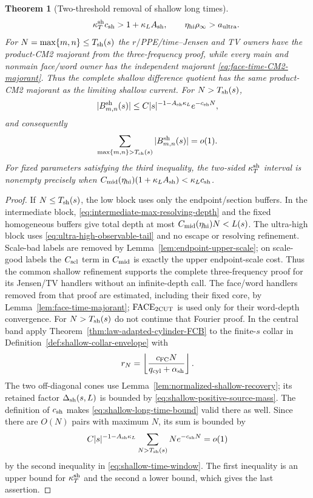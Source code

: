 \documentclass[11pt]{article}
\newtheorem{theorem}{Theorem}[section]
\begin{document}
\begin{theorem}[Two-threshold removal of shallow long times]
\begin{equation}
 \qquad
 \kappa_T^{\rm sh}c_{\rm sh}>1+\kappa_LA_{\rm sh},
 \qquad \eta_{\rm hi}\rho_\infty>a_{\rm ultra}.
\end{equation}
For $N=\max\{m,n\}\le T_{\rm sh}(s)$ the $r/$PPE/time--Jensen and TV
owners have the product-CM2 majorant from the three-frequency proof, while
every main and nonmain face/word owner has the independent majorant
\eqref{eq:face-time-CM2-majorant}.  Thus the complete shallow difference
quotient has the same product-CM2 majorant as the limiting shallow current.
For
$N>T_{\rm sh}(s)$,
\begin{equation}
\label{eq:shallow-long-time-bound}
 |B^{\rm sh}_{m,n}(s)|
 \le C|s|^{-1-A_{\rm sh}\kappa_L}e^{-c_{\rm sh}N},
\end{equation}
and consequently
\begin{equation}
\label{eq:shallow-long-time-sum}
 \sum_{\max\{m,n\}>T_{\rm sh}(s)}
 |B^{\rm sh}_{m,n}(s)|=o(1).
\end{equation}
For fixed parameters satisfying the third inequality, the two-sided
$\kappa_T^{\rm sh}$ interval is nonempty precisely when
$C_{\rm mid}(\eta_{\rm hi})(1+\kappa_LA_{\rm sh})
 <\kappa_Lc_{\rm sh}$.
\end{theorem}

\begin{proof}
If $N\le T_{\rm sh}(s)$, the low block uses only the endpoint/section
buffers.  In the intermediate block, \eqref{eq:intermediate-max-resolving-depth}
and the fixed homogeneous buffers give total depth at most
$C_{\rm mid}(\eta_{\rm hi})N<L(s)$.  The ultra-high block uses
\eqref{eq:ultra-high-observable-tail} and no escape or resolving refinement.
Scale-bad labels are removed by Lemma~\ref{lem:endpoint-upper-scale}; on
scale-good labels the $C_{\rm scl}$ term in $C_{\rm mid}$ is exactly the
upper endpoint-scale cost.  Thus the common shallow refinement supports the
complete three-frequency proof for its Jensen/TV handlers without an
infinite-depth call.  The face/word handlers removed from that proof are
estimated, including their fixed core, by
Lemma~\ref{lem:face-time-majorant}; $\mathrm{FACE}_{\rm 2CUT}$ is used only
for their word-depth convergence.  For $N>T_{\rm sh}(s)$ do not continue
that Fourier proof.  In the central band apply
Theorem~\ref{thm:law-adapted-cylinder-FCB} to the finite-$s$ collar in
Definition~\ref{def:shallow-collar-envelope} with
\[
 r_N=\left\lfloor\frac{c_{\rm FC}N}
 {q_{\rm cyl}+\alpha_{\rm sh}}\right\rfloor .
\]
The two off-diagonal cones use
Lemma~\ref{lem:normalized-shallow-recovery}; its retained factor
$\Delta_{\rm sh}(s,L)$ is bounded by
\eqref{eq:shallow-positive-source-mass}.  The definition of $c_{\rm sh}$ makes
\eqref{eq:shallow-long-time-bound} valid there as well.  Since there are $O(N)$ pairs
with maximum $N$, its sum is bounded by
\[
 C|s|^{-1-A_{\rm sh}\kappa_L}
 \sum_{N>T_{\rm sh}(s)}Ne^{-c_{\rm sh}N}=o(1)
\]
by the second inequality in \eqref{eq:shallow-time-window}.  The first
inequality is an upper bound for $\kappa_T^{\rm sh}$ and the second a lower
bound, which gives the last assertion.
\end{proof}
\end{document}
